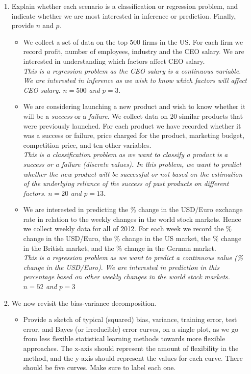 \documentclass[12pt]{article}
\begin{document}
\begin{enumerate}
\item Explain whether each scenario is a classification or regression problem, and indicate whether we are most interested in inference or prediction. Finally, provide $n$ and $p$.
\begin{itemize}
    \item We collect a set of data on the top 500 firms in the US. For each firm we record profit, number of employees, industry and the CEO salary. We are interested in understanding which factors affect CEO salary.
    \\\textit{This is a regression problem as the CEO salary is a continuous variable. We are interested in inference as we wish to know which factors will affect CEO salary. $n=500$ and $p=3$.}
    \item We are considering launching a new product and wish to know whether it will be a \textit{success} or a \textit{failure}. We collect data on 20 similar products that were previously launched. For each product we have recorded whether it was a success or failure, price charged for the product, marketing budget, competition price, and ten other variables.
    \\\textit{This is a classification problem as we want to classify a product is a success or a failure (discrete values). In this problem, we want to predict whether the new product will be successful or not based on the estimation of the underlying reliance of the success of past products on different factors. $n=20$ and $p=13$. }
    \item We are interested in predicting the \% change in the USD/Euro exchange rate in relation to the weekly changes in the world stock markets. Hence we collect weekly data for all of 2012. For each week we record the \% change in the USD/Euro, the \% change in the US market, the \% change in the British market, and the \% change in the German market.
    \\\textit{This is a regression problem as we want to predict a continuous value (\% change in the USD/Euro). We are interested in prediction in this percentage based on other weekly changes in the world stock markets. $n=52$ and $p=3$}
\end{itemize}

\item We now revisit the bias-variance decomposition.

\begin{itemize}
    \item Provide a sketch of typical (squared) bias, variance, training error, test error, and Bayes (or irreducible) error curves, on a single plot, as we go from less flexible statistical learning methods towards more flexible approaches. The x-axis should represent the amount of flexibility in the method, and the y-axis should represent the values for each curve. There should be five curves. Make sure to label each one.
    

\end{itemize}
\end{enumerate}
\end{document}
